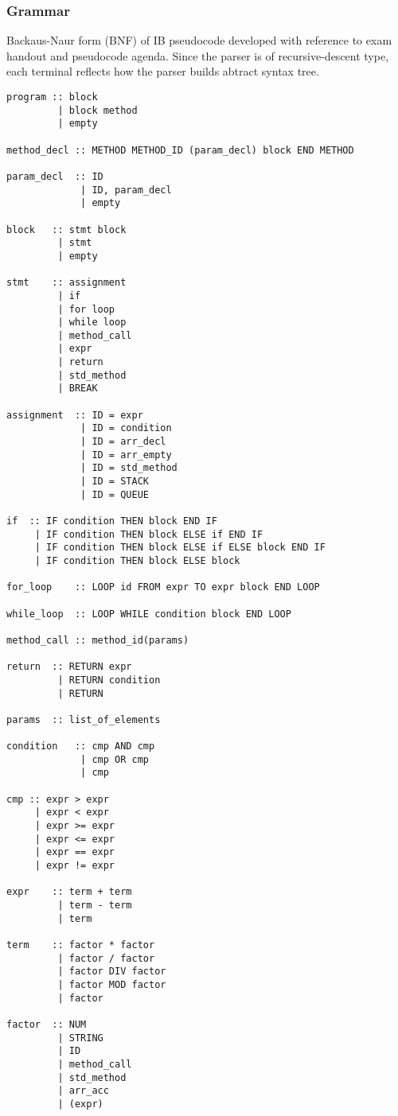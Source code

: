 \documentclass[12pt]{article}
\begin{document}
\subsubsection*{Grammar}
Backaus-Naur form (BNF) of IB pseudocode developed with reference to 
exam handout and pseudocode agenda. Since the parser is of recursive-descent type,
each terminal reflects how the parser builds abtract syntax tree.
\begin{verbatim}
program :: block
         | block method
         | empty

method_decl :: METHOD METHOD_ID (param_decl) block END METHOD

param_decl  :: ID
             | ID, param_decl
             | empty

block   :: stmt block 
         | stmt
         | empty

stmt    :: assignment
         | if
         | for loop
         | while loop
         | method_call
         | expr
         | return
         | std_method
         | BREAK

assignment  :: ID = expr
             | ID = condition
             | ID = arr_decl
             | ID = arr_empty
             | ID = std_method
             | ID = STACK
             | ID = QUEUE

if  :: IF condition THEN block END IF
     | IF condition THEN block ELSE if END IF
     | IF condition THEN block ELSE if ELSE block END IF
     | IF condition THEN block ELSE block

for_loop    :: LOOP id FROM expr TO expr block END LOOP

while_loop  :: LOOP WHILE condition block END LOOP

method_call :: method_id(params) 

return  :: RETURN expr
         | RETURN condition
         | RETURN

params  :: list_of_elements

condition   :: cmp AND cmp
             | cmp OR cmp
             | cmp

cmp :: expr > expr
     | expr < expr
     | expr >= expr
     | expr <= expr
     | expr == expr
     | expr != expr

expr    :: term + term
         | term - term
         | term

term    :: factor * factor
         | factor / factor
         | factor DIV factor
         | factor MOD factor
         | factor

factor  :: NUM
         | STRING
         | ID
         | method_call
         | std_method
         | arr_acc
         | (expr)


\end{verbatim}
\end{document}
